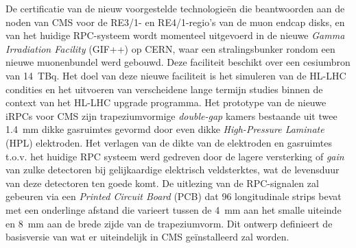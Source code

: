 	De certificatie van de nieuw voorgestelde technologieën die beantwoorden aan de noden van CMS voor de RE3/1- en RE4/1-regio's van de muon endcap disks, en van het huidige RPC-systeem wordt momenteel uitgevoerd in de nieuwe {\it Gamma Irradiation Facility} (GIF++) op CERN, waar een stralingsbunker rondom een nieuwe muonenbundel werd gebouwd. Deze faciliteit beschikt over een cesiumbron van \SI{14}{TBq}. Het doel van deze nieuwe faciliteit is het simuleren van de HL-LHC condities en het uitvoeren van verscheidene lange termijn studies binnen de context van het HL-LHC upgrade programma. Het prototype van de nieuwe iRPCs voor CMS zijn trapeziumvormige {\it double-gap} kamers bestaande uit twee \SI{1.4}{mm} dikke gasruimtes gevormd door even dikke {\it High-Pressure Laminate} (HPL) elektroden. Het verlagen van de dikte van de elektroden en gasruimtes t.o.v. het huidige RPC systeem werd gedreven door de lagere versterking of {\it gain} van zulke detectoren bij gelijkaardige elektrisch veldsterktes, wat de levensduur van deze detectoren ten goede komt. De uitlezing van de RPC-signalen zal gebeuren via een {\it Printed Circuit Board} (PCB) dat 96 longitudinale strips bevat met een onderlinge afstand die varieert tussen de \SI{4}{mm} aan het smalle uiteinde en \SI{8}{mm} aan de brede zijde van de trapeziumvorm. Dit ontwerp definieert de basisversie van wat er uiteindelijk in CMS geïnstalleerd zal worden.\vspace*{5mm}
	
